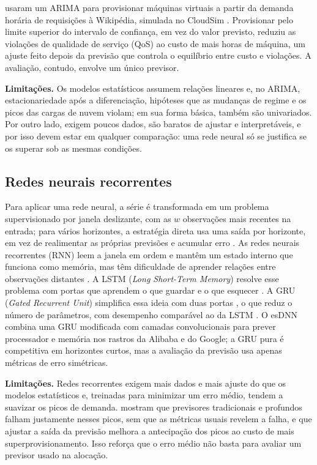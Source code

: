  usaram um ARIMA para provisionar máquinas virtuais a partir da demanda horária de requisições à Wikipédia, simulada no CloudSim \cite{calheiros2011cloudsim}. Provisionar pelo limite superior do intervalo de confiança, em vez do valor previsto, reduziu as violações de qualidade de serviço (QoS) ao custo de mais horas de máquina, um ajuste feito depois da previsão que controla o equilíbrio entre custo e violações. A avaliação, contudo, envolve um único previsor.

\textbf{Limitações.} Os modelos estatísticos assumem relações lineares e, no ARIMA, estacionariedade após a diferenciação, hipóteses que as mudanças de regime e os picos das cargas de nuvem violam; em sua forma básica, também são univariados. Por outro lado, exigem poucos dados, são baratos de ajustar e interpretáveis, e por isso devem estar em qualquer comparação: uma rede neural só se justifica se os superar sob as mesmas condições.

\subsection{Redes neurais recorrentes}
\label{subsec:recorrentes}

Para aplicar uma rede neural, a série é transformada em um problema supervisionado por janela deslizante, com as $w$ observações mais recentes na entrada; para vários horizontes, a estratégia direta usa uma saída por horizonte, em vez de realimentar as próprias previsões e acumular erro \cite{taieb2012strategies}. As redes neurais recorrentes (RNN) leem a janela em ordem e mantêm um estado interno que funciona como memória, mas têm dificuldade de aprender relações entre observações distantes \cite{bengio1994learning}. A LSTM (\textit{Long Short-Term Memory}) resolve esse problema com portas que aprendem o que guardar e o que esquecer \cite{hochreiter1997lstm}. A GRU (\textit{Gated Recurrent Unit}) simplifica essa ideia com duas portas \cite{cho2014gru}, o que reduz o número de parâmetros, com desempenho comparável ao da LSTM \cite{chung2014empirical}. O esDNN \cite{xu2022esdnn} combina uma GRU modificada com camadas convolucionais para prever processador e memória nos rastros da Alibaba e do Google; a GRU pura é competitiva em horizontes curtos, mas a avaliação da previsão usa apenas métricas de erro simétricas.

\textbf{Limitações.} Redes recorrentes exigem mais dados e mais ajuste do que os modelos estatísticos e, treinadas para minimizar um erro médio, tendem a suavizar os picos de demanda.  mostram que previsores tradicionais e profundos falham justamente nesses picos, sem que as métricas usuais revelem a falha, e que ajustar a saída da previsão melhora a antecipação dos picos ao custo de mais superprovisionamento. Isso reforça que o erro médio não basta para avaliar um previsor usado na alocação.

